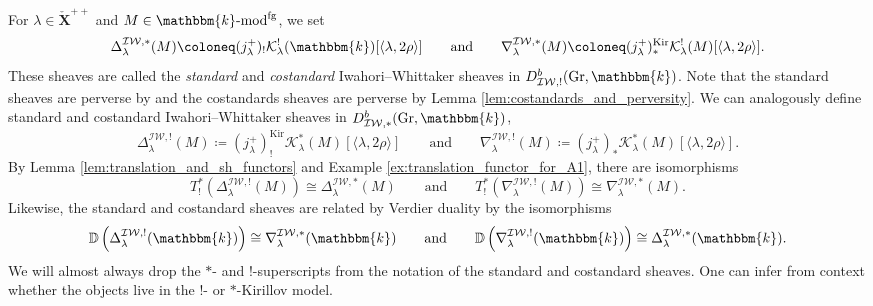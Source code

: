 \documentclass{amsart}
\renewcommand{\k}{\mathbbm{k}}
\newcommand{\scrK}{\mathcal{K}}
\newcommand{\bfXv}{\check{\mathbf{X}}}
\newcommand{\IW}{\mathcal{IW}}
\renewcommand{\mod}[1]{#1\textnormal{-mod}}
\newcommand{\DD}{\mathbb{D}}
\DeclareMathOperator{\Gr}{Gr}
\DeclareMathOperator{\fg}{fg}
\DeclareMathOperator{\Kir}{Kir}
\theoremstyle{definition}
\begin{document}
    For $\lambda \in \bfXv^{++}$ and $M \in \mod{\k}^{\fg}$, we set
    \[\Delta_{\lambda}^{\IW, *} (M) \coloneq (j_{\lambda}^+)_! \scrK_{\lambda}^! (\k) [\langle \lambda, 2\rho \rangle] \qquad\text{and}\qquad \nabla_{\lambda}^{\IW, *} (M) \coloneq (j_{\lambda}^{+})_*^{\Kir} \scrK_{\lambda}^! (M) [\langle \lambda, 2\rho \rangle].\]
    These sheaves are called the \emph{standard} and \emph{costandard} Iwahori--Whittaker sheaves in $D_{\IW, !}^b (\Gr, \k)$.
    Note that the standard sheaves are perverse by \cite[Corollaire 4.1.3]{BBD} and the costandards sheaves are perverse by Lemma \ref{lem:costandards_and_perversity}.
    We can analogously define standard and costandard Iwahori--Whittaker sheaves in $D_{\IW, *}^b (\Gr, \k)$,
    \[\Delta_{\lambda}^{\IW, !} (M) \coloneq (j_{\lambda}^+)_!^{\Kir} \scrK_{\lambda}^* (M) [\langle \lambda, 2\rho \rangle] \qquad\text{and}\qquad \nabla_{\lambda}^{\IW, !} (M) \coloneq (j_{\lambda}^{+})_* \scrK_{\lambda}^* (M) [\langle \lambda, 2\rho \rangle].\]
    By Lemma \ref{lem:translation_and_sh_functors} and Example \ref{ex:translation_functor_for_A1}, there are isomorphisms
    \begin{equation}\label{eq:translation_of_std_costds}
        T_!^* \left( \Delta_{\lambda}^{\IW, !} (M)\right) \cong \Delta_{\lambda}^{\IW, *} (M) \qquad\text{and}\qquad T_!^* \left( \nabla_{\lambda}^{\IW, !} (M)\right) \cong \nabla_{\lambda}^{\IW, *} (M).
    \end{equation}
    Likewise, the standard and costandard sheaves are related by Verdier duality by the isomorphisms
    \begin{equation}\label{eq:DD_of_std_costds}
      \DD \left( \Delta_{\lambda}^{\IW, !} (\k)\right) \cong \nabla_{\lambda}^{\IW, *} (\k) \qquad\text{and}\qquad \DD \left( \nabla_{\lambda}^{\IW, !} (\k)\right) \cong \Delta_{\lambda}^{\IW, *} (\k).  
    \end{equation}
    We will almost always drop the $*$- and $!$-superscripts from the notation of the standard and costandard sheaves. One can infer from context whether the objects live in the $!$- or $*$-Kirillov model.
    
\end{document}

